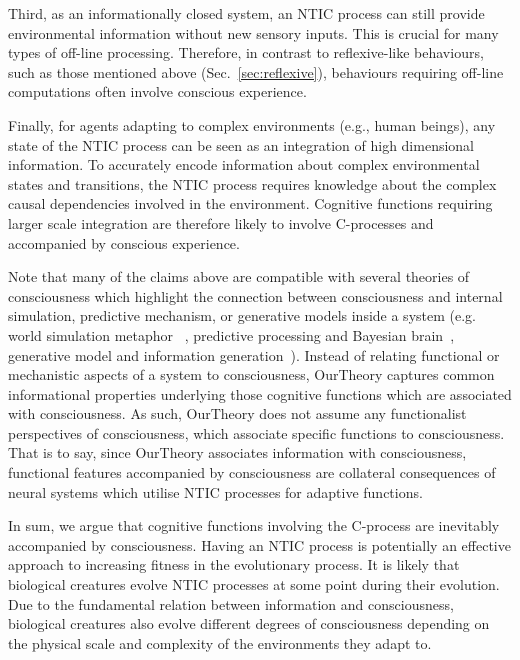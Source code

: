 \documentclass[utf8]{article}
\begin{document}
    	    Third, as an informationally closed system, an NTIC process can still provide environmental information without new sensory inputs. This is crucial for many types of off-line processing. Therefore, in contrast to reflexive-like behaviours, such as those mentioned above (Sec.~\ref{sec:reflexive}), behaviours requiring off-line computations \citep{milner1999paradoxical, himmelbach2005dorsal,revol2003pointing} often involve conscious experience. 
    	    
    	    Finally, for agents adapting to complex environments (e.g., human beings), any state of the NTIC process can be seen as an integration of high dimensional information. To accurately encode information about complex environmental states and transitions, the NTIC process requires knowledge about the complex causal dependencies involved in the environment. Cognitive functions requiring larger scale integration are therefore likely to involve C-processes and accompanied by conscious experience. %
    	    
    	    Note that many of the claims above are compatible with several theories of consciousness which highlight the connection between consciousness and internal simulation, predictive mechanism, or generative models inside a system (e.g. world simulation metaphor ~\citep{revonsuo2006inner}, predictive processing and Bayesian brain~\citep{clark_2013,Hohwy2013,seth2014predictive}, generative model and information generation~\citep{kanai_chang_yu_de_abril_biehl_guttenberg_2019}). Instead of relating functional or mechanistic aspects of a system to consciousness, \ac{OurTheory} captures common informational properties underlying those cognitive functions which are associated with consciousness. As such, \ac{OurTheory} does not assume any functionalist perspectives of consciousness, which associate specific functions to consciousness.  That is to say, since \ac{OurTheory} associates information  with consciousness, functional features accompanied by consciousness are collateral consequences of neural systems which utilise NTIC processes for adaptive functions. 
    	    
    	    In sum, we argue that cognitive functions involving the C-process are inevitably accompanied by consciousness. Having an NTIC process is potentially an effective approach to increasing fitness in the evolutionary process. It is likely that biological creatures evolve NTIC processes at some point during their evolution. Due to the fundamental relation between information and consciousness, biological creatures also evolve different degrees of consciousness depending on the physical scale and complexity of the environments they adapt to. 
    	    
\end{document}
